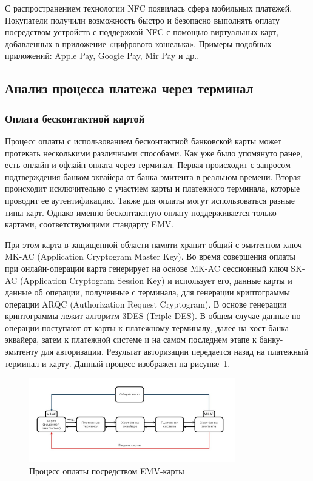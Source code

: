 С распространением технологии NFC появилась сфера мобильных платежей.
Покупатели получили возможность быстро и безопасно выполнять оплату посредством устройств с поддержкой NFC с помощью виртуальных карт, добавленных в приложение «цифрового кошелька».
Примеры подобных приложений: Apple Pay, Google Pay, Mir Pay и др..


\subsection{Анализ процесса платежа через терминал}

\subsubsection{Оплата бесконтактной картой}

Процесс оплаты с использованием бесконтактной банковской карты может протекать несколькими различными способами.
Как уже было упомянуто ранее, есть онлайн и офлайн оплата через терминал.
Первая происходит с запросом подтверждения банком-эквайера от банка-эмитента в реальном времени.
Вторая происходит исключительно с участием карты и платежного терминала, которые проводит ее аутентификацию.
Также для оплаты могут использоваться разные типы карт.
Однако именно бесконтактную оплату поддерживается только картами, соответствующими стандарту EMV.

При этом карта в защищенной области памяти хранит общий с эмитентом ключ MK-AC (Application Cryptogram Master Key).
Во время совершения оплаты при онлайн-операции карта генерирует на основе MK-AC сессионный ключ SK-AC (Application Cryptogram Session Key) и использует его, данные карты и данные об операции, полученные с терминала, для генерации криптограммы операции ARQC (Authorization Request Cryptogram).
В основе генерации криптограммы лежит алгоритм 3DES (Triple DES).
В общем случае данные по операции поступают от карты к платежному терминалу, далее на хост банка-эквайера, затем к платежной системе и на самом последнем этапе к банку-эмитенту для авторизации.
Результат авторизации передается назад на платежный терминал и карту.
Данный процесс изображен на рисунке~\ref{fig:emv_card_payment}.

\begin{figure}[H]
    \centering
    \includegraphics[width=0.8\textwidth]{images/research/emv_card_payment}
    \caption{\centering Процесс оплаты посредством EMV-карты}
    \label{fig:emv_card_payment}
\end{figure}

